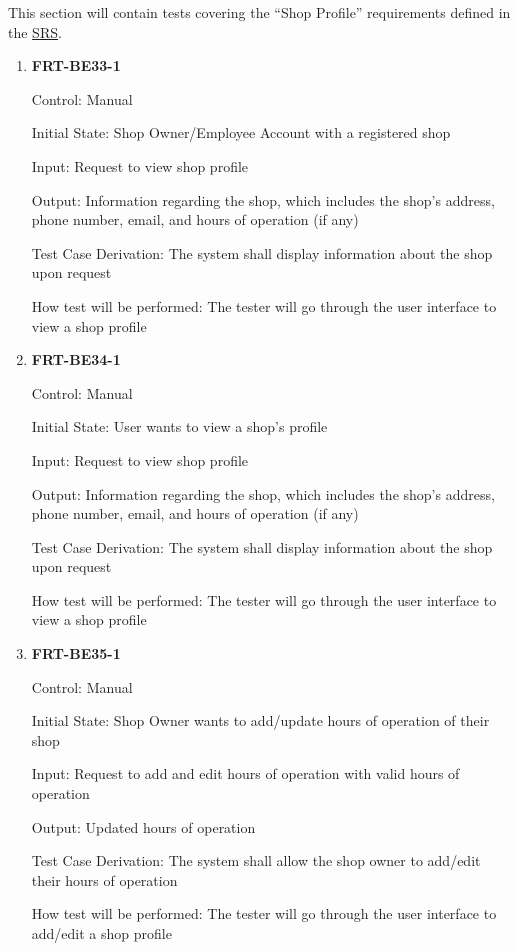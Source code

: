 \documentclass[12pt, titlepage]{article}
\begin{document}
This section will contain tests covering the ``Shop Profile'' requirements defined in the
\href{https://github.com/arkinmodi/project-sayyara/blob/main/docs/SRS/SRS.pdf}{SRS}.

\begin{enumerate}
	\item \textbf{FRT-BE33-1}

	      Control: Manual

	      Initial State: Shop Owner/Employee Account with a registered shop

	      Input: Request to view shop profile

	      Output: Information regarding the shop, which includes the shop's address, phone number, email, and
	      hours of operation (if any)

	      Test Case Derivation: The system shall display information about the shop upon request

	      How test will be performed: The tester will go through the user interface to view a shop profile

	\item \textbf{FRT-BE34-1}

	      Control: Manual

	      Initial State: User wants to view a shop's profile

	      Input: Request to view shop profile

	      Output: Information regarding the shop, which includes the shop's address, phone number, email, and
	      hours of operation (if any)

	      Test Case Derivation: The system shall display information about the shop upon request

	      How test will be performed: The tester will go through the user interface to view a shop profile

	\item \textbf{FRT-BE35-1}

	      Control: Manual

	      Initial State: Shop Owner wants to add/update hours of operation of their shop

	      Input: Request to add and edit hours of operation with valid hours of operation

	      Output: Updated hours of operation

	      Test Case Derivation: The system shall allow the shop owner to add/edit their hours of operation

	      How test will be performed: The tester will go through the user interface to add/edit a shop
	      profile

\end{enumerate}
\end{document}
